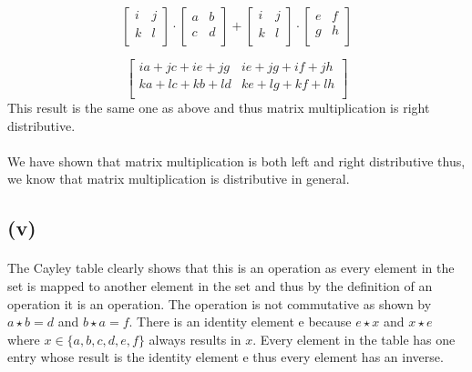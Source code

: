\documentclass{article}
\begin{document}
        \[
            \left[ {\begin{array}{cc}
                i & j \\
                k & l \\
            \end{array} } \right]
            \cdot
            \left[ {\begin{array}{cc}
                a & b \\
                c & d \\
            \end{array} } \right]
            +
            \left[ {\begin{array}{cc}
                i & j \\
                k & l \\
            \end{array} } \right]
            \cdot
            \left[ {\begin{array}{cc}
                e & f \\
                g & h \\
            \end{array} } \right]
        \]

        \[
            \left[ {\begin{array}{cc}
                ia + jc + ie + jg & ie+jg+if+jh\\
                ka + lc + kb + ld & ke+lg+ kf+ lh \\
            \end{array} } \right]
        \]
        This result is the same one as above and thus matrix multiplication is right distributive.
    
        \paragraph{}
        We have shown that matrix multiplication is both left and right distributive thus, we know that matrix multiplication is distributive in general.

     \subsection*{(v)}
        \paragraph{}
            The Cayley table clearly shows that this is an operation as every element in the set is mapped to another element in the set and thus by the definition of an operation it is an operation. The operation is not commutative as shown by $a \star b = d$ and $b \star a = f$. There is an identity element e because $e \star x$ and $x \star e$ where $x \in \{a,b,c,d,e,f\}$ always results in $x$. Every element in the table has one entry whose result is the identity element e thus every element has an inverse.
    
\end{document}
